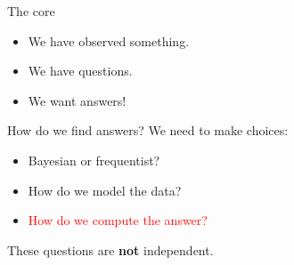 \documentclass[
  ignorenonframetext,
]{beamer}
\providecommand{\tightlist}{%
  \setlength{\itemsep}{0pt}\setlength{\parskip}{0pt}}
\begin{document}
\begin{frame}{The core}
\protect\hypertarget{the-core-2}{}
\begin{itemize}
\tightlist
\item
  We have observed something.
\item
  We have questions.
\item
  We want answers!
\end{itemize}
\end{frame}

\begin{frame}{How do we find answers?}
\protect\hypertarget{how-do-we-find-answers}{}
We need to make choices:

\begin{itemize}[<+->]
\tightlist
\item
  Bayesian or frequentist?
\item
  How do we model the data?
\item
  \textcolor{red}{How do we compute the answer?}
\end{itemize}

\pause

These questions are \textbf{not} independent.
\end{frame}
\end{document}
